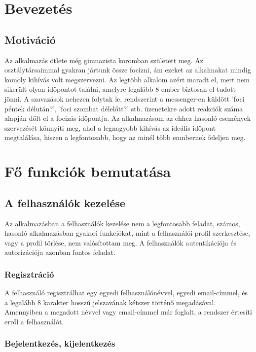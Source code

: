 \documentclass[a4paper,12pt]{report}
\theoremstyle{definition}
\theoremstyle{remark}
\begin{document}
\chapter{Bevezetés}

\section{Motiváció}

Az alkalmazás ötlete még gimnazista koromban született meg. Az osztálytársaimmal gyakran jártunk össze focizni, ám ezeket az alkalmakat mindig komoly kihívás volt megszervezni. Az legtöbb alkalom azért maradt el, mert nem sikerült olyan időpontot találni, amelyre legalább 8 ember biztosan el tudott jönni. A szavazások nehezen folytak le, rendszerint a messenger-en küldött 'foci péntek délután?', 'foci szombat délelőtt?' stb. üzenetekre adott reakciók száma alapján dőlt el a focizás időpontja. Az alkalmazásom az ehhez hasonló események szervezését könnyíti meg, ahol a legnagyobb kihívás az ideális időpont megtalálása, hiszen a legfontosabb, hogy az minél több emnbernek feleljen meg.

\chapter{Fő funkciók bemutatása}

\section{A felhasználók kezelése}

Az alkalmazásban a felhasználók kezelése nem a legfontosabb feladat, számos, hasonló alkalmazásban gyakori funkciókat, mint a felhasználói profil szerkesztése, vagy a profil törlése, nem valósítottam meg. A felhasználók autentikációja és autorizációja azonban fontos feladat.

	\subsection{Regisztráció}

A felhasználó regisztrálhat egy egyedi felhasználónévvel, egyedi email-címmel, és a legalább 8 karakter hosszú jelszavának kétszer történő megadásával. Amennyiben a megadott névvel vagy email-címmel már foglalt, a rendszer értesíti erről a felhasználót.

	\subsection{Bejelentkezés, kijelentkezés}
\end{document}
